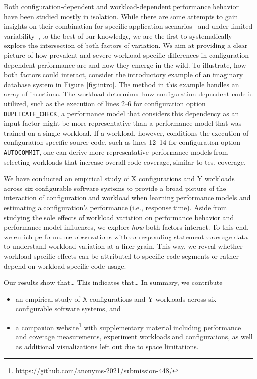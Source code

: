 Both configuration-dependent and workload-dependent performance behavior have been studied mostly in isolation. While there are some attempts to gain insights on their combination for specific application scenarios~\cite{alves_sampling_2020} and under limited variability~\cite{liao_2020_using_emse}, to the best of our knowledge, we are the first to systematically explore the intersection of both factors of variation. We aim at providing a clear picture of how prevalent and severe workload-specific differences in configuration-dependent performance are and how they emerge in the wild. 
{\color{blue!70!black}To illustrate, how both factors could interact, consider the introductory example of an imaginary database system in Figure~\ref{fig:intro}. The method in this example handles an array of insertions. The workload determines how configuration-dependent code is utilized, such as the execution of \colorbox{duplicatecheck}{lines 2--6} for configuration option \texttt{DUPLICATE\_CHECK}, a performance model that considers this dependency as an input factor might be more representative than a performance model that was trained on a single workload. If a workload, however, conditions the execution of configuration-specific source code, such as \colorbox{autocommit}{lines 12--14} for configuration option \texttt{AUTOCOMMIT}, one can derive more representative performance models from selecting workloads that increase overall code coverage, similar to test coverage.}

We have conducted an empirical study of X configurations and Y workloads across six configurable software systems to provide a broad picture of the interaction of configuration and workload when learning performance models and estimating a configuration's performance (i.e., response time). Aside from studying the sole effects of workload variation on performance behavior and performance model influences, we explore \emph{how} both factors interact. To this end, we enrich performance observations with corresponding statement coverage data to understand workload variation at a finer grain. This way, we reveal whether workload-specific effects can be attributed to specific code segments or rather depend on workload-specific code usage.

{\color{red}Our results show that… This indicates that… In summary, we contribute 
	
\begin{itemize}
	\item an empirical study of X configurations and Y workloads across six configurable software systems, and
	\item a companion website\footnote{\url{https://github.com/anonyms-2021/submission-448/}} with supplementary material including performance and coverage measurements, experiment workloads and configurations, as well as additional visualizations left out due to space limitations.
	
\end{itemize}
}


